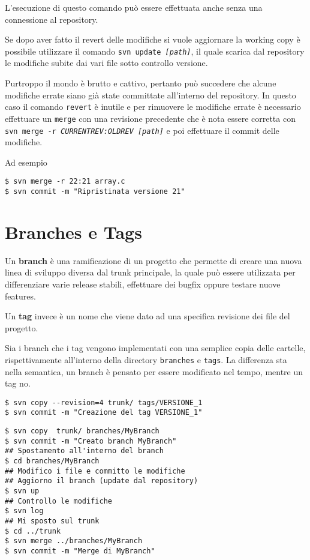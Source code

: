 L'esecuzione di questo comando può essere effettuata anche senza una connessione al repository.
 
Se dopo aver fatto il revert delle modifiche si vuole aggiornare la working copy è possibile utilizzare il comando \texttt{svn update \textit{[path]}}, il quale scarica dal repository le modifiche subite dai vari file sotto controllo versione.

Purtroppo il mondo è brutto e cattivo, pertanto può succedere che alcune modifiche errate siano già state committate all'interno del repository. In questo caso il comando \texttt{revert} è inutile e per rimuovere le modifiche errate è necessario effettuare un \texttt{merge} con una revisione precedente che è nota essere corretta con \texttt{svn merge -r \textit{CURRENTREV:OLDREV [path]}} e poi effettuare il commit delle modifiche.

Ad esempio
	
\begin{lstlisting}
$ svn merge -r 22:21 array.c
$ svn commit -m "Ripristinata versione 21"
\end{lstlisting}

\section{Branches e Tags}

Un \textbf{branch} è una ramificazione di un progetto che permette di creare una nuova linea di sviluppo diversa dal trunk principale, la quale può essere utilizzata per differenziare varie release stabili, effettuare dei bugfix oppure testare nuove features.

Un \textbf{tag} invece è un nome che viene dato ad una specifica revisione dei file del progetto.

Sia i branch che i tag vengono implementati con una semplice copia delle cartelle, rispettivamente all'interno della directory \texttt{branches} e \texttt{tags}. La differenza sta nella semantica, un branch è pensato per essere modificato nel tempo, mentre un tag no.

\begin{lstlisting}[caption=Creazione di un tag]
$ svn copy --revision=4 trunk/ tags/VERSIONE_1
$ svn commit -m "Creazione del tag VERSIONE_1"
\end{lstlisting}

\begin{lstlisting}[caption=Creazione e utilizzo di un branch]
$ svn copy  trunk/ branches/MyBranch
$ svn commit -m "Creato branch MyBranch"
## Spostamento all'interno del branch
$ cd branches/MyBranch
## Modifico i file e committo le modifiche
## Aggiorno il branch (update dal repository)
$ svn up
## Controllo le modifiche
$ svn log
## Mi sposto sul trunk
$ cd ../trunk
$ svn merge ../branches/MyBranch
$ svn commit -m "Merge di MyBranch"
\end{lstlisting}

